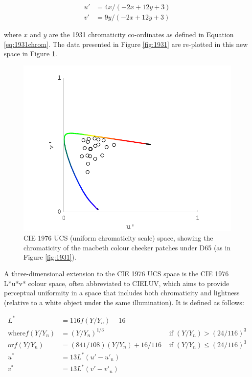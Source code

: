 \begin{subequations}
\begin{align}
u' &= 4x / (-2x + 12y + 3) \\
v' &= 9y / (-2x + 12y + 3)
\end{align}
\end{subequations}

where $x$ and $y$ are the 1931 chromaticity co-ordinates as defined in Equation \ref{eq:1931chrom}. The data presented in Figure \ref{fig:1931} are re-plotted in this new space in Figure \ref{fig:UCS}.

\begin{figure}[htbp]
\includegraphics[max width=\textwidth]{figs/LitRev/ColorimetryDemo3.pdf}
\caption{\gls{CIE} 1976 UCS (uniform chromaticity scale) space, showing the chromaticity of the macbeth colour checker patches under D65 (as in Figure \ref{fig:1931}).}
\label{fig:UCS}
\end{figure}

A three-dimensional extension to the CIE 1976 UCS space is the \gls{CIE} 1976 L*u*v* colour space, often abbreviated to CIELUV, which aims to provide perceptual uniformity in a space that includes both chromaticity and lightness (relative to a white object under the same illumination). It is defined as follows:

\begin{subequations}
\begin{align}
L^{*} &= 116 f(Y/Y_{n})-16 \\
\textrm{where} f(Y/Y_{n}) &= (Y/Y_{n})^{1/3} &\textrm{ if } (Y/Y_{n}) > (24/116)^{3} \\
\textrm{or} f(Y/Y_{n}) &= (841/108)(Y/Y_{n})+16/116 &\textrm{ if } (Y/Y_{n}) \leq (24/116)^{3} \\
u^{*} &= 13L^{*}(u'-u'_{n}) \\ 
v^{*} &= 13L^{*}(v'-v'_{n})
\end{align}
\end{subequations}

